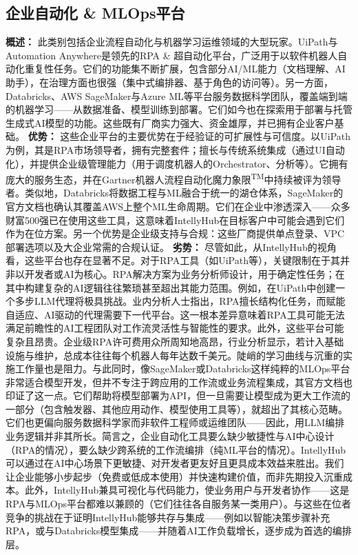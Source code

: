 \documentclass[11pt, a4paper, oneside]{article}
\begin{document}
\subsection{企业自动化 \& MLOps平台}
\textbf{概述：} 此类别包括企业流程自动化与机器学习运维领域的大型玩家。UiPath与Automation Anywhere是领先的RPA \& 超自动化平台，广泛用于以软件机器人自动化重复性任务。它们的功能集不断扩展，包含部分AI/ML能力（文档理解、AI助手），在治理方面也很强（集中式编排器、基于角色的访问等）。另一方面，Databricks、AWS SageMaker与Azure ML等平台服务数据科学团队，覆盖端到端的机器学习——从数据准备、模型训练到部署。它们如今也在探索用于部署与托管生成式AI模型的功能。这些既有厂商实力强大、资金雄厚，并已拥有企业客户基础。
\newline\newline
\textbf{优势：} 这些企业平台的主要优势在于经验证的可扩展性与可信度。以UiPath为例，其是RPA市场领导者，拥有完整套件；擅长与传统系统集成（通过UI自动化），并提供企业级管理能力（用于调度机器人的Orchestrator、分析等）。它拥有庞大的服务生态，并在Gartner\textsuperscript{\textregistered}机器人流程自动化魔力象限\textsuperscript{TM}中持续被评为领导者\cite{uipathGartner}。类似地，Databricks将数据工程与ML融合于统一的湖仓体系，SageMaker的官方文档也确认其覆盖AWS上整个ML生命周期\cite{awsSagemaker}。它们在企业中渗透深入——众多财富500强已在使用这些工具，这意味着IntellyHub在目标客户中可能会遇到它们作为在位方案。另一个优势是企业级支持与合规：这些厂商提供单点登录、VPC部署选项以及大企业常需的合规认证。
\newline\newline
\textbf{劣势：} 尽管如此，从IntellyHub的视角看，这些平台也存在显著不足。对于RPA工具（如UiPath等），关键限制在于其并非以开发者或AI为核心。RPA解决方案为业务分析师设计，用于确定性任务；在其中构建复杂的AI逻辑往往繁琐甚至超出其能力范围。例如，在UiPath中创建一个多步LLM代理将极具挑战。业内分析人士指出，RPA擅长结构化任务，而赋能自适应、AI驱动的代理需要下一代平台\cite{forresterRPAvsAI}。这一根本差异意味着RPA工具可能无法满足前瞻性的AI工程团队对工作流灵活性与智能性的要求。此外，这些平台可能复杂且昂贵。企业级RPA许可费用众所周知地高昂，行业分析显示，若计入基础设施与维护，总成本往往每个机器人每年达数千美元。陡峭的学习曲线与沉重的实施工作量也是阻力。与此同时，像SageMaker或Databricks这样纯粹的MLOps平台非常适合模型开发，但并不专注于跨应用的工作流或业务流程集成，其官方文档也印证了这一点\cite{awsSagemaker}。它们帮助将模型部署为API，但一旦需要让模型成为更大工作流的一部分（包含触发器、其他应用动作、模型使用工具等），就超出了其核心范畴。它们也更偏向服务数据科学家而非软件工程师或运维团队——因此，用LLM编排业务逻辑并非其所长。简言之，企业自动化工具要么缺少敏捷性与AI中心设计（RPA的情况），要么缺少跨系统的工作流编排（纯ML平台的情况）。IntellyHub可以通过在AI中心场景下更敏捷、对开发者更友好且更具成本效益来胜出。我们让企业能够小步起步（免费或低成本使用）并快速构建价值，而非先期投入沉重成本。此外，IntellyHub兼具可视化与代码能力，使业务用户与开发者协作——这是RPA与MLOps平台都难以兼顾的（它们往往各自服务某一类用户）。与这些在位者竞争的挑战在于证明IntellyHub能够共存与集成——例如以智能决策步骤补充RPA，或与Databricks模型集成——并随着AI工作负载增长，逐步成为首选的编排层。
\end{document}
